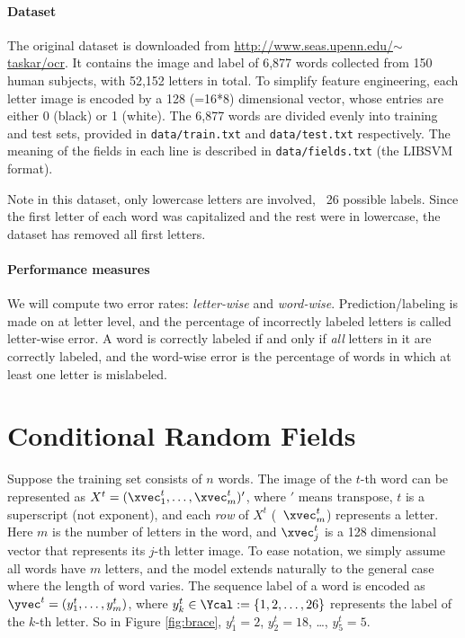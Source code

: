 \documentclass[11pt]{report}
\begin{document}
\paragraph{Dataset}
The original dataset is downloaded from \href{http://www.seas.upenn.edu/~taskar/ocr/}{http://www.seas.upenn.edu/$\sim$taskar/ocr}.
It contains the image and label of 6,877 words collected from 150 human subjects,
with 52,152 letters in total.
To simplify feature engineering, each letter image is encoded by a 128 (=16*8) dimensional vector,
whose entries are either 0 (black) or 1 (white).
The 6,877 words are divided evenly into training and test sets,
provided in \verb#data/train.txt# and \verb#data/test.txt# respectively.
The meaning of the fields in each line is described in \verb#data/fields.txt# (the LIBSVM format).


Note in this dataset, only lowercase letters are involved, \ie\ 26 possible labels.
Since the first letter of each word was capitalized and the rest were in lowercase,
the dataset has removed all first letters.


\paragraph{Performance measures}
%
We will compute two error rates: \emph{letter-wise} and \emph{word-wise}.
Prediction/labeling is made on at letter level,
and the percentage of incorrectly labeled letters is called letter-wise error.
A word is correctly labeled if and only if \emph{all} letters in it are correctly labeled,
and the word-wise error is the percentage of words in which at least one letter is mislabeled.


\section{Conditional Random Fields}

Suppose the training set consists of $n$ words.
The image of the $t$-th word can be represented as
$X^t = (\xvec^t_1, \ldots, \xvec^t_m)'$,
where $'$ means transpose,
$t$ is a superscript (not exponent),
and each \emph{row} of $X^t$ (\eg\ $\xvec^t_m$) represents a letter.
Here $m$ is the number of letters in the word,
and $\xvec^t_j$ is a 128 dimensional vector that represents its $j$-th letter image.
To ease notation, we simply assume all words have $m$ letters,
and the model extends naturally to the general case where the length of word varies.
The sequence label of a word is encoded as
$\yvec^t = (y^t_1, \ldots, y^t_m)$,
where $y^t_k \in \Ycal := \{1, 2, \ldots, 26\}$ represents the label of the $k$-th letter.
So in Figure \ref{fig:brace}, $y^t_1 = 2$, $y^t_2 = 18$, \ldots, $y^t_5 = 5$.
\end{document}
